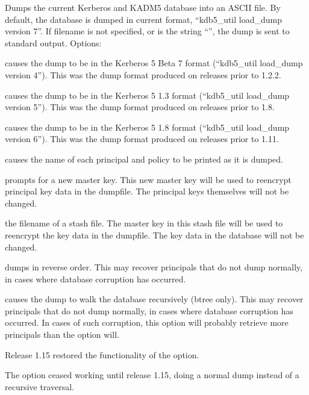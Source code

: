 \documentclass[letterpaper,10pt,english]{sphinxmanual}
\begin{document}
\sphinxAtStartPar
Dumps the current Kerberos and KADM5 database into an ASCII file.  By
default, the database is dumped in current format, “kdb5\_util
load\_dump version 7”.  If filename is not specified, or is the string
“\sphinxhyphen{}”, the dump is sent to standard output.  Options:
\begin{description}
\sphinxAtStartPar
causes the dump to be in the Kerberos 5 Beta 7 format (“kdb5\_util
load\_dump version 4”).  This was the dump format produced on
releases prior to 1.2.2.

\sphinxAtStartPar
causes the dump to be in the Kerberos 5 1.3 format (“kdb5\_util
load\_dump version 5”).  This was the dump format produced on
releases prior to 1.8.

\sphinxAtStartPar
causes the dump to be in the Kerberos 5 1.8 format (“kdb5\_util
load\_dump version 6”).  This was the dump format produced on
releases prior to 1.11.

\sphinxAtStartPar
causes the name of each principal and policy to be printed as it
is dumped.

\sphinxAtStartPar
prompts for a new master key.  This new master key will be used to
re\sphinxhyphen{}encrypt principal key data in the dumpfile.  The principal keys
themselves will not be changed.

\sphinxAtStartPar
the filename of a stash file.  The master key in this stash file
will be used to re\sphinxhyphen{}encrypt the key data in the dumpfile.  The key
data in the database will not be changed.

\sphinxAtStartPar
dumps in reverse order.  This may recover principals that do not
dump normally, in cases where database corruption has occurred.

\sphinxAtStartPar
causes the dump to walk the database recursively (btree only).
This may recover principals that do not dump normally, in cases
where database corruption has occurred.  In cases of such
corruption, this option will probably retrieve more principals
than the  option will.

\sphinxAtStartPar
{}Release 1.15 restored the functionality of the 
option.

\sphinxAtStartPar
{}The  option ceased working until release 1.15,
doing a normal dump instead of a recursive traversal.

\end{description}
\end{document}
